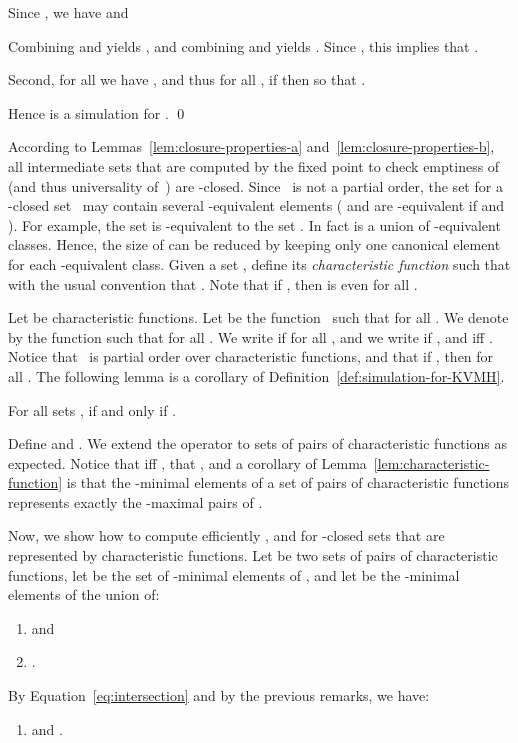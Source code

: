 \documentclass{LMCS}
\begin{document}
Since , we have  and

Combining  and  yields 
, 
and combining  and  yields
. 
Since , this implies that .

Second, for all  we have , and
thus for all , if
 then  so that
.

Hence  is a simulation for .
\qed

According to Lemmas~\ref{lem:closure-properties-a} and~\ref{lem:closure-properties-b}, 
all intermediate sets that are computed by the fixed point  to check emptiness of
 (and thus universality of~) are -closed. 
Since~ is not a partial order, 
the set  for a -closed set~
may contain several -equivalent elements ( and  are 
-equivalent if  and ).
For example, the set  is 
-equivalent to the set 
.
In fact  is a union of -equivalent classes.
Hence, the size of  can be reduced by keeping only one canonical 
element for each -equivalent class.
Given a set , define its \emph{characteristic function}  such that 
with the usual convention that .
Note that if , then  is even for all .

Let  be characteristic functions. Let  be the function~ 
such that  for all .
We denote by  the function such that  for all .  
We write  if for all ,  and we write 
 if ,  and  iff .
Notice that~ is partial order over characteristic functions,
and that if , then  for all .
The following lemma is a corollary of Definition~\ref{def:simulation-for-KVMH}.

\begin{lem}\label{lem:characteristic-function}
  For all sets , 
  if and only if .
\end{lem}


Define  and 
.
We extend the operator  to sets of pairs of characteristic
functions as expected. 
Notice that  iff , that , and 
a corollary of Lemma~\ref{lem:characteristic-function} is that 
the -minimal elements of a set  of pairs of characteristic functions
represents exactly the -maximal pairs  of .








Now, we show how to compute efficiently ,  and  for
-closed sets that are represented by
characteristic functions. 
Let  be two sets of pairs of
characteristic functions, let  be the set
of -minimal elements of , and let  be the -minimal elements
of the union of:
\begin{enumerate}[]
\item[]  and
\item[] .
\end{enumerate}
By Equation~\eqref{eq:intersection} and by the previous remarks, we have:
\begin{enumerate}[]
\item[]  and .
\end{enumerate}\medskip
\end{document}

